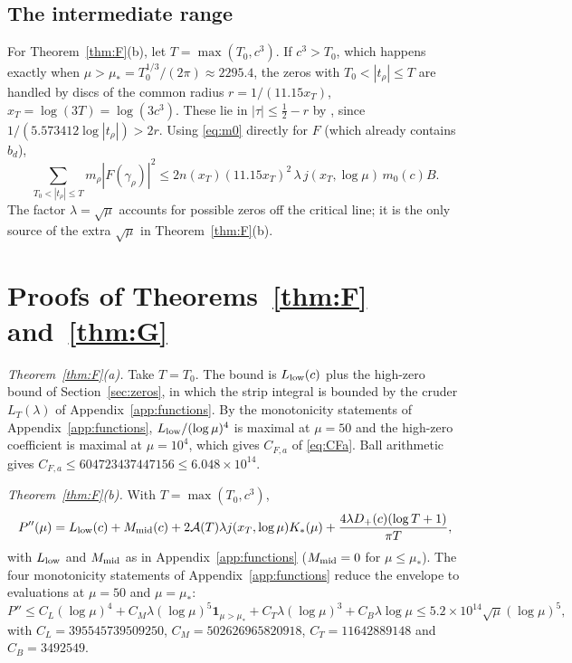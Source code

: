 \documentclass[11pt]{amsart}
\theoremstyle{remark}
\numberwithin{equation}{section}
\begin{document}
\subsection{The intermediate range}
For Theorem~\ref{thm:F}(b), let $T=\max(T_0,c^3)$. If $c^3>T_0$, which happens exactly when $\mu>\mu_*=T_0^{1/3}/(2\pi)\approx2295.4$, the zeros with $T_0<|t_\rho|\le T$ are handled by discs of the common radius $r=1/(11.15x_T)$, $x_T=\log(3T)=\log(3c^3)$. These lie in $|\tau|\le\frac12-r$ by \cite{MT15}, since $1/(5.573412\log|t_\rho|)>2r$. Using \eqref{eq:m0} directly for $F$ (which already contains $\hat b_d$),
\[
\sum_{T_0<|t_\rho|\le T}m_\rho|F(\gamma_\rho)|^2\le2n(x_T)(11.15x_T)^2\,\lambda\,j(x_T,\log\mu)\,m_0(c)B.
\]
The factor $\lambda=\sqrt\mu$ accounts for possible zeros off the critical line; it is the only source of the extra $\sqrt\mu$ in Theorem~\ref{thm:F}(b).

\section{Proofs of Theorems~\ref{thm:F} and~\ref{thm:G}}\label{sec:proofs}

\emph{Theorem~\ref{thm:F}(a).} Take $T=T_0$. The bound is $L_{\rm low}(c)$ plus the high-zero bound of Section~\ref{sec:zeros}, in which the strip integral is bounded by the cruder $L_T(\lambda)$ of Appendix~\ref{app:functions}. By the monotonicity statements of Appendix~\ref{app:functions}, $L_{\rm low}/(\log\mu)^4$ is maximal at $\mu=50$ and the high-zero coefficient is maximal at $\mu=10^4$, which gives $C_{F,a}$ of \eqref{eq:CFa}. Ball arithmetic gives $C_{F,a}\le604723437447156\le6.048\times10^{14}$.

\emph{Theorem~\ref{thm:F}(b).} With $T=\max(T_0,c^3)$,
\begin{equation}\label{eq:Ppp}
P''(\mu)=L_{\rm low}(c)+M_{\rm mid}(c)+2\mathcal A(T)\lambda j(x_T,\log\mu)K_*(\mu)+\frac{4\lambda D_+(c)(\log T+1)}{\pi T},
\end{equation}
with $L_{\rm low}$ and $M_{\rm mid}$ as in Appendix~\ref{app:functions} ($M_{\rm mid}=0$ for $\mu\le\mu_*$). The four monotonicity statements of Appendix~\ref{app:functions} reduce the envelope to evaluations at $\mu=50$ and $\mu=\mu_*$:
\[
P''\le C_L(\log\mu)^4+C_M\lambda(\log\mu)^5\mathbf 1_{\mu>\mu_*}+C_T\lambda(\log\mu)^3+C_B\lambda\log\mu\le5.2\times10^{14}\sqrt\mu(\log\mu)^5,
\]
with $C_L=395545739509250$, $C_M=502626965820918$, $C_T=11642889148$ and $C_B=3492549$.
\end{document}
